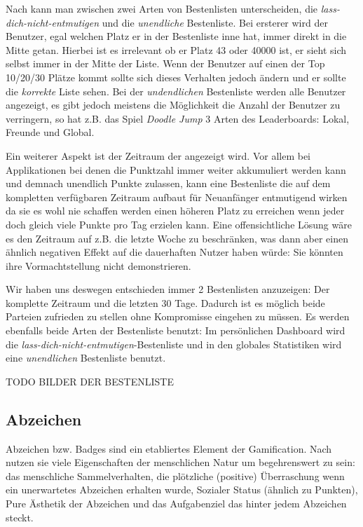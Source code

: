 \documentclass[12pt,twoside]{book}
\begin{document}
Nach \citep{zichermann2011gamification} kann man zwischen zwei Arten von Bestenlisten unterscheiden, die \textit{lass-dich-nicht-entmutigen} und die \textit{unendliche} Bestenliste. Bei ersterer wird der Benutzer, egal welchen Platz er in der Bestenliste inne hat, immer direkt in die Mitte getan. Hierbei ist es irrelevant ob er Platz 43 oder 40000 ist, er sieht sich selbst immer in der Mitte der Liste. Wenn der Benutzer auf einen der Top 10/20/30 Plätze kommt sollte sich dieses Verhalten jedoch ändern und er sollte die \textit{korrekte} Liste sehen.
Bei der \textit{undendlichen} Bestenliste werden alle Benutzer angezeigt, es gibt jedoch meistens die Möglichkeit die Anzahl der Benutzer zu verringern, so hat z.B. das Spiel \textit{Doodle Jump} 3 Arten des Leaderboards: Lokal, Freunde und Global.

Ein weiterer Aspekt ist der Zeitraum der angezeigt wird. Vor allem bei Applikationen bei denen die Punktzahl immer weiter akkumuliert werden kann und demnach unendlich Punkte zulassen, kann eine Bestenliste die auf dem kompletten verfügbaren Zeitraum aufbaut für Neuanfänger entmutigend wirken da sie es wohl nie schaffen werden einen höheren Platz zu erreichen wenn jeder doch gleich viele Punkte pro Tag erzielen kann.
Eine offensichtliche Lösung wäre es den Zeitraum auf z.B. die letzte Woche zu beschränken, was dann aber einen ähnlich negativen Effekt auf die dauerhaften Nutzer haben würde: Sie könnten ihre Vormachtstellung nicht demonstrieren.

Wir haben uns deswegen entschieden immer 2 Bestenlisten anzuzeigen: Der komplette Zeitraum und die letzten 30 Tage. Dadurch ist es möglich beide Parteien zufrieden zu stellen ohne Kompromisse eingehen zu müssen. Es werden ebenfalls beide Arten der Bestenliste benutzt: Im persönlichen Dashboard wird die \textit{lass-dich-nicht-entmutigen}-Bestenliste und in den globales Statistiken wird eine \textit{unendlichen} Bestenliste benutzt.

TODO BILDER DER BESTENLISTE

\subsection{Abzeichen}

Abzeichen bzw. Badges sind ein etabliertes Element der Gamification. Nach \citep{zichermann2011gamification} nutzen sie viele Eigenschaften der menschlichen Natur um begehrenswert zu sein: das menschliche Sammelverhalten, die plötzliche (positive) Überraschung wenn ein unerwartetes Abzeichen erhalten wurde, Sozialer Status (ähnlich zu Punkten), Pure Ästhetik der Abzeichen und das Aufgabenziel das hinter jedem Abzeichen steckt.
\end{document}
